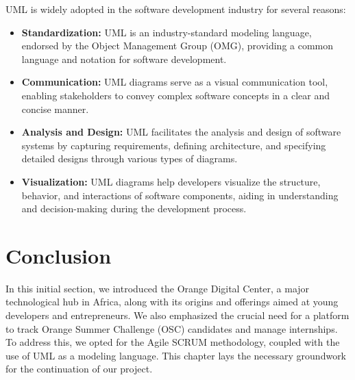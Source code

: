 UML is widely adopted in the software development industry for several reasons:

\begin{itemize}[label=-]
      \item \textbf{Standardization:} UML is an industry-standard modeling
            language, endorsed by the Object Management Group (OMG), providing
            a
            common
            language and notation for software development.
      \item \textbf{Communication:} UML diagrams serve as a visual
            communication
            tool, enabling stakeholders to convey complex software concepts in
            a
            clear and
            concise manner.
      \item \textbf{Analysis and Design:} UML facilitates the analysis and
            design
            of software systems by capturing requirements, defining
            architecture,
            and
            specifying detailed designs through various types of diagrams.
      \item \textbf{Visualization:} UML diagrams help developers visualize the
            structure, behavior, and interactions of software components,
            aiding in
            understanding and decision-making during the development process.
\end{itemize}

\section{Conclusion}
In this initial section, we introduced the Orange Digital Center, a major
technological hub in Africa, along with its origins and offerings aimed at
young developers and entrepreneurs. We also emphasized the crucial need for a
platform to track Orange Summer Challenge (OSC) candidates and manage
internships. To address this, we opted for the Agile SCRUM methodology, coupled
with the use of UML as a modeling language. This chapter lays the necessary
groundwork for the continuation of our project.
